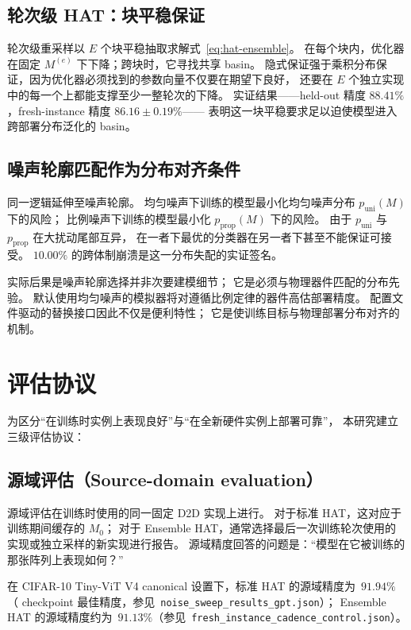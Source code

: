 \subsection{轮次级 HAT：块平稳保证}

轮次级重采样以 $E$ 个块平稳抽取求解式~\ref{eq:hat-ensemble}。
在每个块内，优化器在固定 $M^{(e)}$ 下下降；跨块时，它寻找共享 basin。
隐式保证强于乘积分布保证，因为优化器必须找到的参数向量不仅要在期望下良好，
还要在 $E$ 个独立实现中的每一个上都能支撑至少一整轮次的下降。
实证结果——held-out 精度 $88.41\%$，fresh-instance 精度 $86.16\pm0.19\%$——
表明这一块平稳要求足以迫使模型进入跨部署分布泛化的 basin。

\subsection{噪声轮廓匹配作为分布对齐条件}

同一逻辑延伸至噪声轮廓。
均匀噪声下训练的模型最小化均匀噪声分布 $p_{\mathrm{uni}}(M)$ 下的风险；
比例噪声下训练的模型最小化 $p_{\mathrm{prop}}(M)$ 下的风险。
由于 $p_{\mathrm{uni}}$ 与 $p_{\mathrm{prop}}$ 在大扰动尾部互异，
在一者下最优的分类器在另一者下甚至不能保证可接受。
$10.00\%$ 的跨体制崩溃是这一分布失配的实证签名。

实际后果是噪声轮廓选择并非次要建模细节；
它是必须与物理器件匹配的分布先验。
默认使用均匀噪声的模拟器将对遵循比例定律的器件高估部署精度。
配置文件驱动的替换接口因此不仅是便利特性；
它是使训练目标与物理部署分布对齐的机制。

\section{评估协议}
\label{sec:eval-protocols}

为区分``在训练时实例上表现良好''与``在全新硬件实例上部署可靠''，
本研究建立三级评估协议：

\subsection{源域评估（Source-domain evaluation）}

源域评估在训练时使用的同一固定 D2D 实现上进行。
对于标准 HAT，这对应于训练期间缓存的 $M_0$；
对于 Ensemble HAT，通常选择最后一次训练轮次使用的实现或独立采样的新实现进行报告。
源域精度回答的问题是：``模型在它被训练的那张阵列上表现如何？''

在 CIFAR-10 Tiny-ViT V4 canonical 设置下，标准 HAT 的源域精度为~$91.94\%$
（ checkpoint 最佳精度，参见~\texttt{noise\_sweep\_results\_gpt.json}）；
Ensemble HAT 的源域精度约为~$91.13\%$（参见~\texttt{fresh\_instance\_cadence\_control.json}）。

